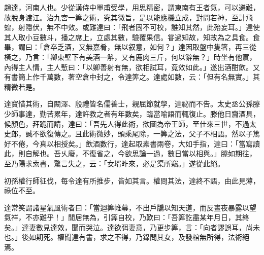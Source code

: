 \begin{pinyinscope}
 
 
 趙達，河南人也。少從漢侍中單甫受學，用思精密，謂東南有王者氣，可以避難，故脫身渡江。治九宮一筭之術，究其微旨，是以能應機立成，對問若神，至計飛蝗，射隱伏，無不中效。或難達曰：「飛者固不可校，誰知其然，此殆妄耳。」達使其人取小豆數斗，播之席上，立處其數，驗覆果信。甞過知故，知故為之具食。食畢，謂曰：「倉卒乏酒，又無嘉肴，無以叙意，如何？」達因取盤中隻箸，再三從橫之，乃言：「卿東壁下有美酒一斛，又有鹿肉三斤，何以辭無？」時坐有他賔，內得主人情，主人慙曰：「以卿善射有無，欲相試耳，竟效如此。」遂出酒酣飲。又有書簡上作千萬數，著空倉中封之，令達筭之。達處如數，云：「但有名無實。」其精微若是。
 
 
 
 
 達寶惜其術，自闞澤、殷禮皆名儒善士，親屈節就學，達祕而不告。太史丞公孫滕少師事達，勤苦累年，達許教之者有年數矣，臨當喻語而輒復止。滕他日齎酒具，候顏色，拜跪而請，達曰：「吾先人得此術，欲圖為帝王師，至仕來三世，不過太史郎，誠不欲復傳之。且此術微妙，頭乘尾除，一筭之法，父子不相語。然以子篤好不倦，今真以相授矣。」飲酒數行，達起取素書兩卷，大如手指，達曰：「當寫讀此，則自解也。吾乆廢，不復省之，今欲思論一過，數日當以相與。」滕如期往，至乃陽求索書，驚言失之，云：「女壻昨來，必是渠所竊。」遂從此絕。
 
 
 
 
 初孫權行師征伐，每令達有所推步，皆如其言。權問其法，達終不語，由此見薄，祿位不至。
 
 
 
 
達常笑謂諸星氣風術者曰：「當迴筭帷幕，不出戶牖以知天道，而反晝夜暴露以望氣祥，不亦難乎！」閒居無為，引筭自校，乃歎曰：「吾筭訖盡某年月日，其終矣。」達妻數見達效，聞而哭泣。達欲弭妻意，乃更步筭，言：「向者謬誤耳，尚未也。」後如期死。權聞達有書，求之不得，乃錄問其女，及發棺無所得，法術絕焉。
 

\end{pinyinscope}
